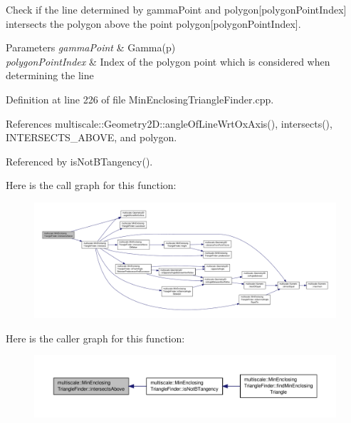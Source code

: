 Check if the line determined by gamma\-Point and polygon\mbox{[}polygon\-Point\-Index\mbox{]} intersects the polygon above the point polygon\mbox{[}polygon\-Point\-Index\mbox{]}. 


\begin{DoxyParams}{Parameters}
{\em gamma\-Point} & Gamma(p) \\
\hline
{\em polygon\-Point\-Index} & Index of the polygon point which is considered when determining the line \\
\hline
\end{DoxyParams}


Definition at line 226 of file Min\-Enclosing\-Triangle\-Finder.\-cpp.



References multiscale\-::\-Geometry2\-D\-::angle\-Of\-Line\-Wrt\-Ox\-Axis(), intersects(), I\-N\-T\-E\-R\-S\-E\-C\-T\-S\-\_\-\-A\-B\-O\-V\-E, and polygon.



Referenced by is\-Not\-B\-Tangency().



Here is the call graph for this function\-:\nopagebreak
\begin{figure}[H]
\begin{center}
\leavevmode
\includegraphics[width=350pt]{classmultiscale_1_1MinEnclosingTriangleFinder_aba0848fcc9021b379fd5f02a6708912d_cgraph}
\end{center}
\end{figure}




Here is the caller graph for this function\-:\nopagebreak
\begin{figure}[H]
\begin{center}
\leavevmode
\includegraphics[width=350pt]{classmultiscale_1_1MinEnclosingTriangleFinder_aba0848fcc9021b379fd5f02a6708912d_icgraph}
\end{center}
\end{figure}


